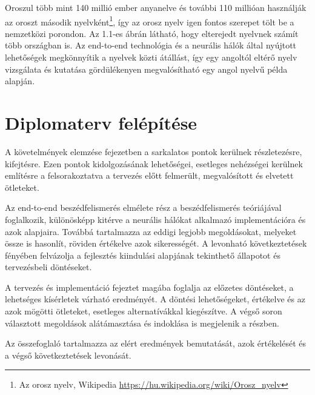 Oroszul több mint 140 millió ember anyanelve és további 110 millióan használják az oroszt második nyelvként\footnote{Az orosz nyelv, Wikipedia \url{https://hu.wikipedia.org/wiki/Orosz_nyelv}}, így az orosz nyelv igen fontos szerepet tölt be a nemzetközi porondon. Az 1.1-es ábrán látható, hogy elterejedt nyelvnek számít több országban is. Az end-to-end technológia és a neurális hálók által nyújtott lehetőségek megkönnyítik a nyelvek közti átállást, így egy angoltól eltérő nyelv vizsgálata és kutatása gördülékenyen megvalósítható egy angol nyelvű példa alapján.

\section{Diplomaterv felépítése}

A követelmények elemzése fejezetben a sarkalatos pontok kerülnek részletezésre, kifejtésre. Ezen pontok kidolgozásának lehetőségei, esetleges nehézségei kerülnek említésre a felsorakoztatva a tervezés előtt felmerült, megvalósított és elvetett ötleteket.

Az end-to-end beszédfelismerés elmélete rész a beszédfelismerés teóriájával foglalkozik, különösképp kitérve a neurális hálókat alkalmazó implementációra és azok alapjaira. Továbbá tartalmazza az eddigi legjobb megoldásokat, melyeket össze is hasonlít, röviden értékelve azok sikerességét. A levonható következtetések fényében felvázolja a fejlesztés kiindulási alapjának tekinthető állapotot és tervezésbeli döntéseket.

A tervezés és implementáció fejeztet magába foglalja az előzetes döntéseket, a lehetséges kísérletek várható eredményét. A döntési lehetőségeket, értékelve és az azok mögötti ötleteket, esetleges alternatívákkal kiegészítve. A végső soron választott megoldások alátámasztása és indoklása is megjelenik a részben.

Az összefoglaló tartalmazza az elért eredmények bemutatását, azok értékelését és a végső következtetések levonását.
